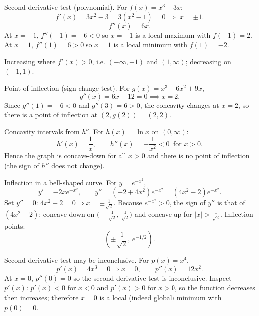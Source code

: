 \documentclass[11pt]{article}
\def\textbf#1{#1}%
\begin{document}
\begin{solution}
\textbf{Second derivative test (polynomial).} For $f(x)=x^{3}-3x$:
\[
f'(x)=3x^{2}-3=3(x^{2}-1)=0 \;\Rightarrow\; x=\pm 1.
\]
\[
f''(x)=6x.
\]
At $x=-1$, $f''(-1)=-6<0$ so $x=-1$ is a local maximum with $f(-1)=2$.
At $x=1$, $f''(1)=6>0$ so $x=1$ is a local minimum with $f(1)=-2$.

Increasing where $f'(x)>0$, i.e. $(-\infty,-1)$ and $(1,\infty)$; decreasing on $(-1,1)$.
\end{solution}

\begin{solution}
\textbf{Point of inflection (sign-change test).} For $g(x)=x^{3}-6x^{2}+9x$,
\[
g''(x)=6x-12=0 \implies x=2.
\]
Since $g''(1)=-6<0$ and $g''(3)=6>0$, the concavity changes at $x=2$, so there is a point of inflection at $(2,g(2))=(2,2)$.
\end{solution}


\begin{solution}
\textbf{Concavity intervals from $h''$.} For $h(x)=\ln x$ on $(0,\infty)$:
\[
h'(x)=\frac{1}{x},\qquad h''(x)=-\frac{1}{x^{2}}<0 \;\text{ for } x>0.
\]
Hence the graph is concave-down for all $x>0$ and there is no point of inflection (the sign of $h''$ does not change).
\end{solution}

\begin{solution}
\textbf{Inflection in a bell-shaped curve.} For $y=e^{-x^{2}}$,
\[
y'=-2xe^{-x^{2}},\qquad
y''=(-2+4x^{2})e^{-x^{2}}=(4x^{2}-2)e^{-x^{2}}.
\]
Set $y''=0$: $4x^{2}-2=0\Rightarrow x=\pm\frac{1}{\sqrt{2}}$.
Because $e^{-x^{2}}>0$, the sign of $y''$ is that of $(4x^{2}-2)$:
concave-down on $\big(-\tfrac{1}{\sqrt{2}},\,\tfrac{1}{\sqrt{2}}\big)$ and concave-up for $|x|>\tfrac{1}{\sqrt{2}}$.
Inflection points:
\[
\left(\pm\frac{1}{\sqrt{2}},\,e^{-1/2}\right).
\]
\end{solution}

\begin{solution}
\textbf{Second derivative test may be inconclusive.} For $p(x)=x^{4}$,
\[
p'(x)=4x^{3}=0 \Rightarrow x=0,\qquad p''(x)=12x^{2}.
\]
At $x=0$, $p''(0)=0$ so the second derivative test is inconclusive.
Inspect $p'(x)$: $p'(x)<0$ for $x<0$ and $p'(x)>0$ for $x>0$, so the function decreases then increases; therefore $x=0$ is a local (indeed global) minimum with $p(0)=0$.
\end{solution}
\end{document}

